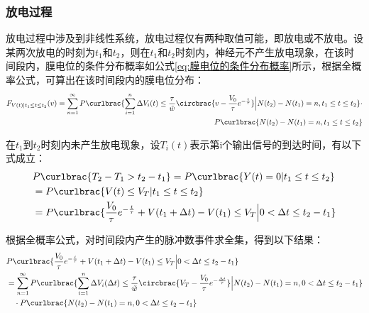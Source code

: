 \documentclass[11pt]{article}
\begin{document}
\subsubsection{放电过程}
放电过程中涉及到非线性系统，放电过程仅有两种取值可能，即放电或不放电。设某两次放电的时刻为$t_1$和$t_2$，则在$t_1$和$t_2$时刻内，神经元不产生放电现象，在该时间段内，膜电位的条件分布概率如公式\ref{eq:膜电位的条件分布概率}所示，根据全概率公式，可算出在该时间段内的膜电位分布：
\begin{align}
  \begin{aligned}
    F_{V(t)|t_1\le t\le t_2}(v)=    \sum_{n=1}^{\infty}P\curlbrac{\sum_{i=1}^{n}\Delta V_i(t)\le \frac{\tau}{\tilde{w}}\circbrac{v-\frac{V_0}{\tau}e^{-\frac{t}{\tau}}}\Big| N(t_2)-N(t_1)=n,t_1\le t\le t_2}\cdot \\
    P\curlbrac{ N(t_2)-N(t_1)=n,t_1\le t\le t_2}
  \end{aligned}
\end{align}\par
在$t_1$到$t_2$时刻内未产生放电现象，设$T_i(t)$表示第i个输出信号的到达时间，有以下式成立：
\begin{align*}
   & P\curlbrac{T_2-T_{1}>t_2-t_1}=P\curlbrac{Y(t)=0|t_1\le t\le t_2}                                          \\
   & =  P\curlbrac{V(t)\le V_T|t_1\le t\le t_2}                                                                \\
   & = P\curlbrac{\frac{V_0}{\tau}e^{-\frac{t}{\tau}}+V(t_1+\Delta t)-V(t_1)\le V_T\Big|0<\Delta t\le t_2-t_1}
\end{align*}\par
根据全概率公式，对时间段内产生的脉冲数事件求全集，得到以下结果：
\begin{align}
  \begin{aligned}
     & P\curlbrac{\frac{V_0}{\tau}e^{-\frac{t}{\tau}}+V(t_1+\Delta t)-V(t_1)\le V_T\Big|0<\Delta t\le t_2-t_1}                                                                                          \\
     & =\sum_{n=1}^{\infty}P\curlbrac{\sum_{i=1}^{n}\Delta V_i(\Delta t)\le \frac{\tau}{\tilde{w}}\circbrac{V_T-\frac{V_0}{\tau}e^{-\frac{\Delta t}{\tau}}}\Big| N(t_2)-N(t_1)=n,0<\Delta t\le t_2-t_1} \\
     & \quad\cdot  P\curlbrac{ N(t_2)-N(t_1)=n,0<\Delta t\le t_2-t_1}
  \end{aligned}
  \label{eq:放电过程等价事件全集}
\end{align}\par
\end{document}
